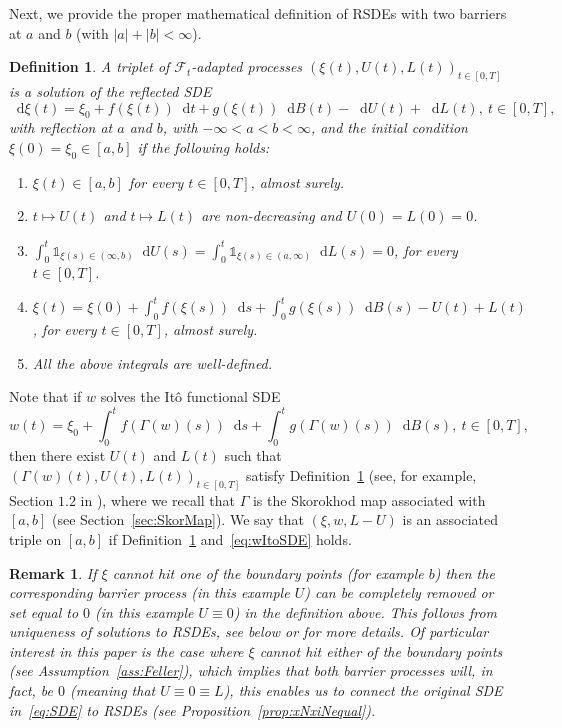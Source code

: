 \documentclass[11pt]{amsart}
\newtheorem{remark}[theorem]{Remark}
\newtheorem{defi}[theorem]{Definition}
\newcommand*\diff{\mathop{}\!\mathrm{d}}
\begin{document}
{Next, we provide the proper mathematical definition of RSDEs with two barriers at $a$ and $b$ (with $|a|+|b|<\infty$).
\begin{defi}\label{def:RSDE}
A triplet of $\mathcal{F}_{t}$-adapted processes $(\xi(t),U(t),L(t))_{t \in [0,T]}$ is a solution of the reflected SDE
\begin{equation*}
\diff \xi(t) = \xi_{0} + f(\xi(t)) \diff t + g(\xi(t)) \diff B(t) - \diff U(t) + \diff L(t),\ t \in [0,T],
\end{equation*}
with reflection at $a$ and $b$, with $-\infty<a<b<\infty$, and the initial condition $\xi(0) = \xi_{0} \in [a,b]$ if the following holds:
\begin{enumerate}
\item $\xi(t) \in [a,b]$ for every $t \in [0,T]$, almost surely.
\item $t \mapsto U(t)$ and $t \mapsto L(t)$ are non-decreasing and $U(0) = L(0)=0$.
\item $\int_{0}^{t} \mathbb{1}_{\xi(s) \in (\infty,b)} \diff U(s) = \int_{0}^{t} \mathbb{1}_{\xi(s) \in (a,\infty)} \diff L(s) = 0$, for every $t \in [0,T]$.
\item $\xi(t) = \xi(0) + \int_{0}^{t} f(\xi(s)) \diff s + \int_{0}^{t} g(\xi(s)) \diff B(s) - U(t) + L(t)$, for every $t \in [0,T]$, almost surely.
\item All the above integrals are well-defined.
\end{enumerate}
\end{defi}
Note that if $w$ solves the Itô functional SDE
\begin{equation}\label{eq:wItoSDE}
w(t) = \xi_{0} + \int_{0}^{t} f(\Gamma(w)(s)) \diff s + \int_{0}^{t} g(\Gamma(w)(s)) \diff B(s),\ t \in [0,T],
\end{equation}
then there exist $U(t)$ and $L(t)$ such that $(\Gamma(w)(t),U(t),L(t))_{t \in [0,T]}$ satisfy Definition~\ref{def:RSDE} (see, for example, Section $1.2$ in \cite{MR2349573}), where we recall that $\Gamma$ is the Skorokhod map associated with $[a,b]$ (see Section~\ref{sec:SkorMap}). We say that $(\xi,w,L-U)$ is an associated triple on $[a,b]$ if Definition~\ref{def:RSDE} and~\eqref{eq:wItoSDE} holds.
\begin{remark}
If $\xi$ cannot hit one of the boundary points (for example $b$) then the corresponding barrier process (in this example $U$) can be completely removed or set equal to $0$ (in this example $U \equiv 0$) in the definition above. This follows from uniqueness of solutions to RSDEs, see below or \cite{Pilipenko2014AnIT} for more details. Of particular interest in this paper is the case where $\xi$ cannot hit either of the boundary points (see Assumption~\ref{ass:Feller}), which implies that both barrier processes will, in fact, be $0$ (meaning that $U \equiv 0 \equiv L$), this enables us to connect the original SDE in~\eqref{eq:SDE} to RSDEs (see Proposition~\ref{prop:xNxiNequal}).
\end{remark}

}
\end{document}
